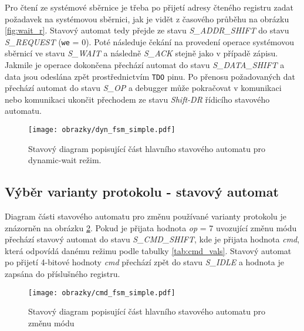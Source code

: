 Pro čtení ze systémové sběrnice je třeba po přijetí adresy čteného registru zadat požadavek na systémovou sběrnici, jak je vidět z časového průběhu na obrázku \ref{fig:wait_r}. Stavový automat tedy přejde ze stavu \textit{S\_ADDR\_SHIFT} do stavu \textit{S\_REQUEST} (\texttt{we} = 0). Poté následuje čekání na provedení operace systémovou sběrnicí ve stavu \textit{S\_WAIT} a následně \textit{S\_ACK} stejně jako v případě zápisu. Jakmile je operace dokončena přechází automat do stavu \textit{S\_DATA\_SHIFT} a data jsou odeslána zpět prostřednictvím \texttt{\acs{TDO}} pinu. Po přenosu požadovaných dat přechází automat do stavu \textit{S\_OP} a debugger může pokračovat v komunikaci nebo komunikaci ukončit přechodem ze stavu \textit{Shift-DR} řídicího stavového automatu.

\begin{figure}[H]
  \begin{center}
    \texttt{[image: obrazky/dyn\_fsm\_simple.pdf]}
  \end{center}
  \caption{Stavový diagram popisující část hlavního stavového automatu pro dynamic-wait režim.}
	\label{fig:dyn_wait_fsm}
\end{figure}

\subsection{Výběr varianty protokolu - stavový automat} \label{subsec:cmd-fsm}
Diagram části stavového automatu pro změnu používané varianty protokolu je znázorněn na obrázku \ref{fig:cmd_fsm}. Pokud je přijata hodnota \textit{op} = 7 uvozující změnu módu přechází stavový automat do stavu \textit{S\_CMD\_SHIFT}, kde je přijata hodnota \textit{cmd}, která odpovídá danému režimu podle tabulky \ref{tab:cmd_vals}. Stavový automat po přijetí 4-bitové hodnoty \textit{cmd} přechází zpět do stavu \textit{S\_IDLE} a hodnota je zapsána do příslušného registru.

\begin{figure}[!h]
  \begin{center}
    \texttt{[image: obrazky/cmd\_fsm\_simple.pdf]}
  \end{center}
  \caption{Stavový diagram popisující část hlavního stavového automatu pro změnu módu}
	\label{fig:cmd_fsm}
\end{figure}

